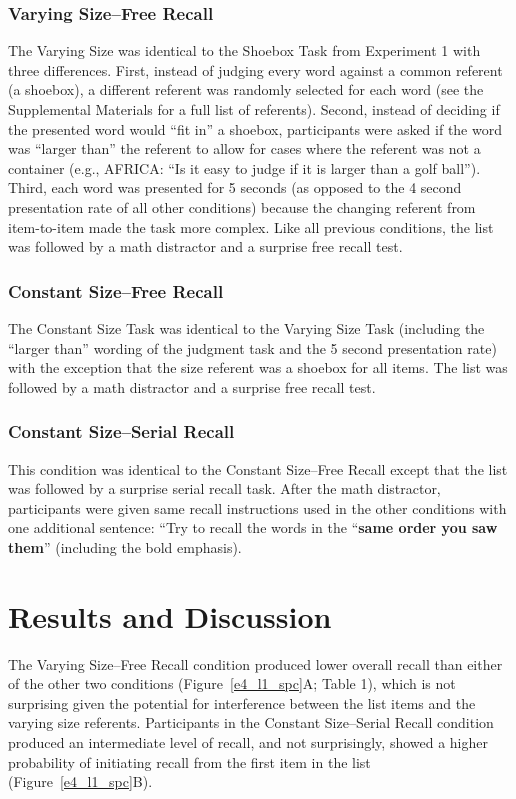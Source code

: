 \documentclass[man,natbib,floatsintext]{apa6} %
\begin{document}
\subsubsection{Varying Size--Free Recall}
The Varying Size  was identical to the Shoebox Task from Experiment 1 with three differences. First, instead of judging every word against a common referent (a shoebox), a different referent was randomly selected for each word (see the Supplemental Materials for a full list of referents). Second, instead of deciding if the presented word would ``fit in'' a shoebox, participants were asked if the word was ``larger than'' the referent to allow for cases where the referent was not a container (e.g., AFRICA: ``Is it easy to judge if it is larger than a golf ball''). Third, each word was presented for 5 seconds (as opposed to the 4 second presentation rate of all other conditions) because the changing referent from item-to-item made the task more complex. Like all previous conditions, the list was followed by a math distractor and a surprise free recall test.

\subsubsection{Constant Size--Free Recall}
The Constant Size Task was identical to the Varying Size Task (including the ``larger than'' wording of the judgment task and the 5 second presentation rate) with the exception that the size referent was a shoebox for all items. The list was followed by a math distractor and a surprise free recall test.

\subsubsection{Constant Size--Serial Recall} 
This condition was identical to the Constant Size--Free Recall except that the list was followed by a surprise serial recall task. After the math distractor, participants were given same recall instructions used in the other conditions with one additional sentence: ``Try to recall the words in the ``\textbf{same order you saw them}'' (including the bold emphasis).

\section{Results and Discussion}
The Varying Size--Free Recall condition produced lower overall recall than either of the other two conditions (Figure~\ref{e4_l1_spc}A; Table 1), which is not surprising given the potential for interference between the list items and the varying size referents. Participants in the Constant Size--Serial Recall condition produced an intermediate level of recall, and not surprisingly, showed a higher probability of initiating recall from the first item in the list (Figure~\ref{e4_l1_spc}B).
\end{document}

